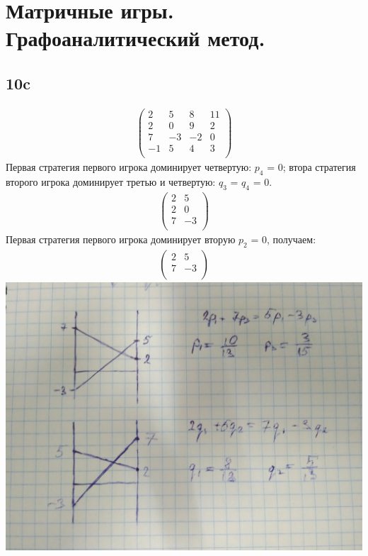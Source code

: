 \documentclass{article}
\begin{document}
\newcommand{\boldX}{\boldsymbol{X}}
\newcommand{\boldY}{\boldsymbol{Y}}
\newcommand{\boldx}{\boldsymbol{x}}
\newcommand{\boldy}{\boldsymbol{y}}

\newcommand{\RejectRegion}{R}
\newcommand{\pvalue}{\text{p-value}\xspace}


\maketitle

\section*{Матричные игры. Графоаналитический метод.}
\subsection*{10c}
\begin{gather*}\left(\begin{matrix}
2 & 5 & 8 & 11\\
2 & 0 & 9 & 2\\
7 & -3 & -2 & 0\\
 -1 & 5 & 4 & 3\\
\end{matrix}\right)\end{gather*}
Первая стратегия первого игрока доминирует четвертую: $p_4$ = 0; втора стратегия второго игрока доминирует третью и четвертую: $q_3$ = $q_4$ = 0.
\begin{gather*}\left(\begin{matrix}
2 & 5\\
2 & 0\\
7 & -3\\
\end{matrix}\right)\end{gather*}
Первая стратегия первого игрока доминирует вторую $p_2$ = 0, получаем:
\begin{gather*}\left(\begin{matrix}
2 & 5\\
7 & -3\\
\end{matrix}\right)\end{gather*}
\includegraphics[scale=0.1]{IMG_20180406_001049.jpg}
\end{document}
